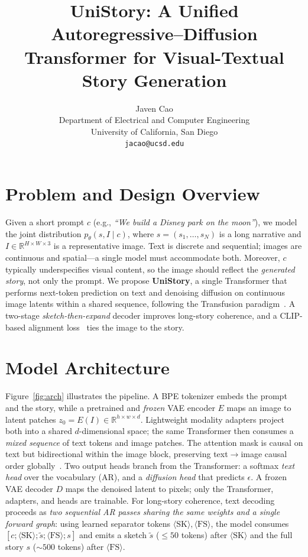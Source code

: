 \documentclass{article}
\title{UniStory: A Unified Autoregressive--Diffusion Transformer for Visual-Textual Story Generation}
\author{%
  Javen Cao \\
  Department of Electrical and Computer Engineering \\
  University of California, San Diego \\
  \texttt{jacao@ucsd.edu}
}
\begin{document}
\maketitle

\vspace{-1.0em}

\section{Problem and Design Overview}
\label{sec:intro}

Given a short prompt $c$ (e.g., \emph{``We build a Disney park on the moon''}), we model the joint distribution $p_{\theta}(s, I \mid c)$, where $s = (s_1, \dots, s_N)$ is a long narrative and $I \in \mathbb{R}^{H \times W \times 3}$ is a representative image. Text is discrete and sequential; images are continuous and spatial---a single model must accommodate both. Moreover, $c$ typically underspecifies visual content, so the image should reflect the \emph{generated story}, not only the prompt. We propose \textbf{UniStory}, a single Transformer that performs next-token prediction on text and denoising diffusion on continuous image latents within a shared sequence, following the Transfusion paradigm~\citep{zhou2024transfusion}. A two-stage \emph{sketch-then-expand} decoder improves long-story coherence, and a CLIP-based alignment loss~\citep{radford2021clip} ties the image to the story.

\section{Model Architecture}
\label{sec:arch}

Figure~\ref{fig:arch} illustrates the pipeline. A BPE tokenizer embeds the prompt and the story, while a pretrained and \emph{frozen} VAE encoder $E$ maps an image to latent patches $z_0 = E(I) \in \mathbb{R}^{h \times w \times d}$. Lightweight modality adapters project both into a shared $d$-dimensional space; the same Transformer then consumes a \emph{mixed sequence} of text tokens and image patches. The attention mask is causal on text but bidirectional within the image block, preserving text$\rightarrow$image causal order globally~\citep{zhou2024transfusion}. Two output heads branch from the Transformer: a softmax \emph{text head} over the vocabulary (AR), and a \emph{diffusion head} that predicts $\epsilon$. A frozen VAE decoder $D$ maps the denoised latent to pixels; only the Transformer, adapters, and heads are trainable. For long-story coherence, text decoding proceeds as \emph{two sequential AR passes sharing the same weights and a single forward graph}: using learned separator tokens $\langle\text{SK}\rangle,\langle\text{FS}\rangle$, the model consumes $[c; \langle\text{SK}\rangle; \tilde{s}; \langle\text{FS}\rangle; s]$ and emits a sketch $\tilde{s}$ ($\leq\!50$ tokens) after $\langle\text{SK}\rangle$ and the full story $s$ ($\sim\!500$ tokens) after $\langle\text{FS}\rangle$.
\end{document}
